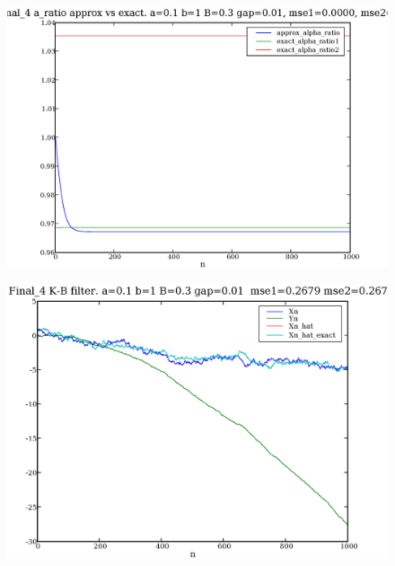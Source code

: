 \documentclass[a4paper,10pt]{article}
\begin{document}
\begin{figure}
\includegraphics[width=1\textwidth]{Final_4_alpha_ratio_comp_a_0.1_b_1_B_0.3_gap_0.01.eps}
\caption{}\label{f9}
\end{figure}

\begin{figure}
\includegraphics[width=1\textwidth]{Final_4_Xn_Yn_Xn_hat_a_0.1_b_1_B_0.3_gap_0.01.eps}
\caption{}\label{f10}
\end{figure}
\end{document}
